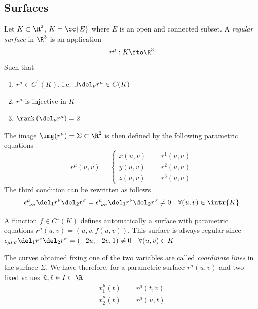 \documentclass[../mmf.tex]{subfiles}
\begin{document}
\subsection{Surfaces}
\begin{dfn}
	Let $K\subset\R^{2}$, $K=\cc{E}$ where $E$ is an open and connected subset. A \textit{regular surface} in $\R^3$ is an application
	\begin{equation*}
		r^\mu:K\fto\R^3
	\end{equation*}
	Such that
	\begin{enumerate}
	\item $r^\mu\in C^1(K)$, i.e. $\exists\del_\nu r^\mu\in C(K)$
	\item $r^\mu$ is injective in $K$
	\item $\rank\left(\del_\nu r^\mu\right)=2$
	\end{enumerate}
	The image $\img(r^\mu)=\Sigma\subset\R^2$ is then defined by the following parametric equations
	\begin{equation}
		r^\mu(u,v)=\left\{\begin{aligned}x(u,v)&=r^1(u,v)\\y(u,v)&=r^2(u,v)\\z(u,v)&=r^3(u,v)\end{aligned}\right.
		\label{eq:parametricsurf}
	\end{equation}
	The third condition can be rewritten as follows
	\begin{equation}
		\epsilon^\mu_{\ \nu\sigma}\del_1r^\nu\del_2r^\sigma=\epsilon^\mu_{\ \nu\sigma}\del_1r^\nu\del_2r^\sigma\ne0\quad\forall(u,v)\in\intr{K}
		\label{eq:surfregcond}
	\end{equation}
\end{dfn}
\begin{rmk}
	A function $f\in C^1(K)$ defines automatically a surface with parametric equations $r^\mu(u,v)=(u,v,f(u,v))$. This surface is always regular since $\epsilon_{\mu\nu\sigma}\del_1r^\nu\del_2r^\sigma=(-2u,-2v,1)\ne0\quad\forall(u,v)\in K$
\end{rmk}
\begin{dfn}
	The curves obtained fixing one of the two variables are called \textit{coordinate lines} in the surface $\Sigma$. We have therefore, for a parametric surface $r^\mu(u,v)$ and two fixed values $\tilde{u},\tilde{v}\in I\subset\R$
	\begin{equation}
		\begin{aligned}
			x_1^\mu(t)&=r^\mu(t,\tilde{v})\\
			x_2^\mu(t)&=r^\mu(\tilde{u},t)
		\end{aligned}
		\label{eq:coordinatelines}
	\end{equation}
\end{dfn}
\end{document}
